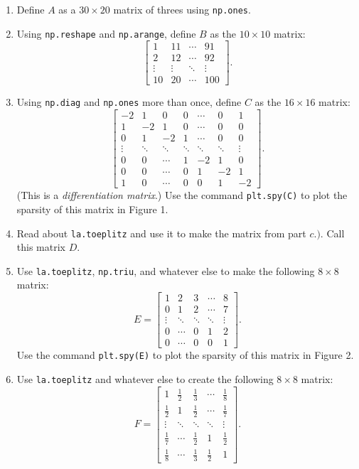 \documentclass[]{exam}
\numberwithin{equation}{section}
\begin{document}
\begin{questions}
\begin{enumerate}
\item[$a.)$] Define $A$ as a $30\times 20$ matrix of threes using \texttt{np.ones}.
\item[$b.)$] Using \texttt{np.reshape} and \texttt{np.arange}, define $B$ as the $10 \times 10$ matrix:
\[\displaystyle \begin{bmatrix} 1 & 11 & \cdots & 91 \\ 2 & 12 & \cdots & 92 \\ 
\vdots & \vdots & \ddots & \vdots \\
10 & 20 & \cdots & 100\end{bmatrix}.\]
\item[$c.)$] Using \texttt{np.diag} and \texttt{np.ones} more than once, define $C$ as the $16\times 16$ matrix: 
\[\displaystyle \begin{bmatrix} -2 & 1 & 0 & 0 &  \cdots & 0 & 1 \\ 
1 & -2 & 1 & 0 & \cdots & 0 & 0 \\ 
0 & 1 & -2 & 1  & \cdots & 0 & 0 \\ 
\vdots & \ddots &  \ddots & \ddots &  \ddots & \ddots & \vdots \\
0 & 0  & \cdots & 1& -2 & 1 & 0\\
0 & 0  & \cdots & 0&  1& -2 & 1\\
1 & 0  & \cdots & 0 & 0  &1& -2 \end{bmatrix}.\]
(This is a \textit{differentiation matrix}.) Use the command \texttt{plt.spy(C)} to plot the sparsity of this matrix in Figure 1. 

\item[$d.)$] Read about \texttt{la.toeplitz} and use it to make the matrix from part $c.)$.  Call this matrix $D$.

\item[$e.)$] Use \texttt{la.toeplitz}, \texttt{np.triu}, and whatever else to make the following $8\times 8$ matrix:
\[\displaystyle E = \begin{bmatrix} 1 & 2 & 3 & \cdots & 8  \\ 
0  & 1 & 2 & \cdots & 7 \\ 
\vdots & \ddots & \ddots & \ddots & \vdots \\
0 &  \cdots & 0 & 1 & 2 \\
0 &  \cdots & 0 & 0 & 1\end{bmatrix}.\]
Use the command \texttt{plt.spy(E)} to plot the sparsity of this matrix in Figure 2.
 
\item[$f.)$] Use \texttt{la.toeplitz} and whatever else to create the following $8\times 8$ matrix:
\[\displaystyle F = \begin{bmatrix} 1 & \frac{1}{2} & \frac{1}{3} & \cdots & \frac{1}{8}  \\ 
\frac{1}{2}  & 1 & \frac{1}{2} & \cdots & \frac{1}{7} \\ 
\vdots & \ddots & \ddots & \ddots & \vdots \\
\frac{1}{7} &  \cdots & \frac{1}{2} & 1 & \frac{1}{2} \\
\frac{1}{8} &  \cdots & \frac{1}{3} & \frac{1}{2} & 1\end{bmatrix}.\]


\end{enumerate}
\end{questions}
\end{document}
